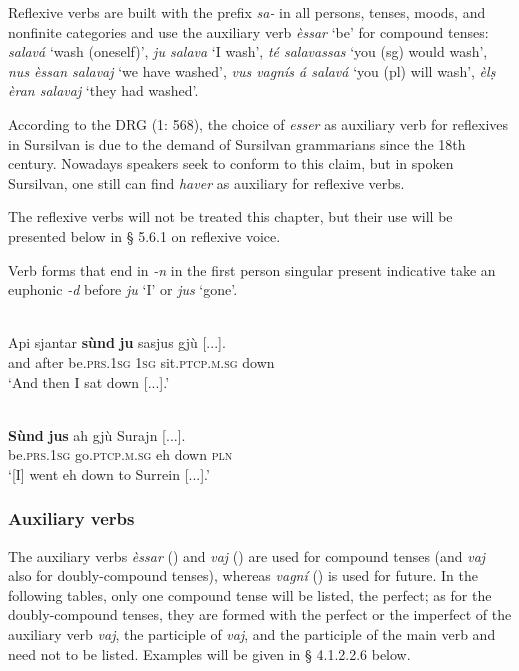Reflexive verbs are built with the prefix \textit{sa-} in all persons, tenses, moods, and nonfinite categories and use the auxiliary verb \textit{èssar} `be' for compound tenses: \textit{salavá} `wash (oneself)', \textit{ju salava} `I wash', \textit{té salavassas} `you (sg) would wash', \textit{nus èssan salavaj} `we have washed', \textit{vus vagnís á salavá} `you (pl) will wash', \textit{èlṣ èran salavaj} `they had washed'.

According to the DRG (1: 568), the choice of \textit{esser} as auxiliary verb for reflexives in Sursilvan is due to the demand of Sursilvan grammarians since the 18th century. Nowadays speakers seek to conform to this claim, but in spoken Sursilvan, one still can find \textit{haver} as auxiliary for reflexive verbs.

The reflexive verbs will not be treated this chapter, but their use will be presented below in § 5.6.1 on reflexive voice.

Verb forms that end in \textit{-n} in the first person singular present indicative take an euphonic \textit{-d} before \textit{ju} `I' or \textit{jus} `gone'.

\ea
\label{}
\\
\gll  Api sjantar \textbf{sùnd} \textbf{ju} sasjus gjù [...].\\
and after be.\textsc{prs.1sg} \textsc{1sg} sit.\textsc{ptcp.m.sg} down\\
\glt `And then I sat down [...].'
\z

\ea
\label{}
\\
\gll   \textbf{Sùnd} \textbf{jus} ah gjù Surajn [...]. \\
be.\textsc{prs.1sg} go.\textsc{ptcp.m.sg} eh down \textsc{pln}\\
\glt `[I] went eh down to Surrein [...].'
\z


\subsubsection{Auxiliary verbs}
The auxiliary verbs \textit{èssar} () and \textit{vaj} () are used for compound tenses (and \textit{vaj} also for doubly-compound tenses), whereas \textit{vagní} () is used for future. In the following tables, only one compound tense will be listed, the perfect; as for the doubly-compound tenses, they are formed with the perfect or the imperfect of the auxiliary verb \textit{vaj}, the participle of \textit{vaj}, and the participle of the main verb and need not to be listed. Examples will be given in § 4.1.2.2.6 below.

